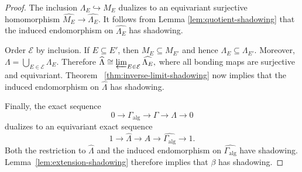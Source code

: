 \documentclass[10pt,a4paper]{amsart}
\begin{document}
\begin{proof}
The inclusion $\Lambda_E\hookrightarrow M_E$ dualizes to an
equivariant surjective homomorphism
$\widehat{M_E}\to\widehat{\Lambda_E}$. It follows from Lemma \ref{lem:quotient-shadowing} that the induced
endomorphism on $\widehat{\Lambda_E}$ has shadowing.



Order $\mathcal E$ by inclusion. If $E\subseteq E'$, then
$M_E\subseteq M_{E'}$ and hence
$\Lambda_E\subseteq\Lambda_{E'}$. Moreover,
$
\Lambda=\bigcup_{E\in\mathcal E}\Lambda_E.
$
Therefore
$
\widehat\Lambda
\cong
\varprojlim_{E\in\mathcal E}\widehat{\Lambda_E},
$
where all bonding maps are surjective and equivariant. Theorem~
\ref{thm:inverse-limit-shadowing} now implies that the induced
endomorphism on $\widehat\Lambda$ has shadowing.

Finally, the exact sequence
\[
0\longrightarrow\Gamma_{\mathrm{alg}}
\longrightarrow\Gamma
\longrightarrow\Lambda
\longrightarrow 0
\]
dualizes to an equivariant exact sequence
\[
1\longrightarrow\widehat\Lambda
\longrightarrow A
\longrightarrow\widehat{\Gamma_{\mathrm{alg}}}
\longrightarrow 1.
\]
Both the restriction to $\widehat\Lambda$ and the induced
endomorphism on $\widehat{\Gamma_{\mathrm{alg}}}$ have shadowing.
Lemma~\ref{lem:extension-shadowing} therefore implies that $\beta$ has
shadowing.
\end{proof}
\end{document}
